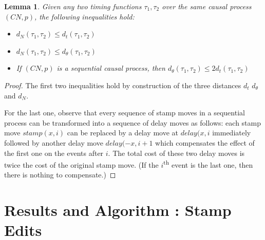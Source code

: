 \documentclass[conference]{IEEEtran}
\newtheorem{lemma}[theorem]{Lemma}
\begin{document}
        \begin{lemma}
          \label{lemma:distances}
          Given any two timing functions $\tau_1, \tau_2$ over the same causal
          process $(CN, p)$, the following inequalities hold:
	  \begin{itemize}
          \item $d_N(\tau_1, \tau_2) \leq d_t(\tau_1, \tau_2)$
          \item $d_N(\tau_1, \tau_2) \leq d_\theta(\tau_1, \tau_2)$
          \item If $(CN, p)$ is a sequential causal process, then $d_\theta(\tau_1, \tau_2) \leq 2 d_t(\tau_1, \tau_2)$
          \end{itemize}
        \end{lemma}
        \begin{proof}
          The first two inequalities hold by construction of the three distances \(d_t\) \(d_\theta\) and \(d_N\).

          For the last one, observe that every sequence of stamp moves in a sequential process can be
          transformed into a sequence of delay moves as follows: each stamp move
          \(stamp(x, i)\) can be replaced by a delay move at \(delay(x, i\) immediately
          followed by another delay move \(delay(-x, i+1\) which compensates the
          effect of the first one on the events after \(i\). The total cost of
          these two delay moves is twice the cost of the original stamp move. (If
          the \(i\)\textsuperscript{th} event is the last one, then there is nothing to
          compensate.)
          
        \end{proof}
	
		  
	\section{Results and Algorithm : Stamp Edits}\label{3}
\end{document}

